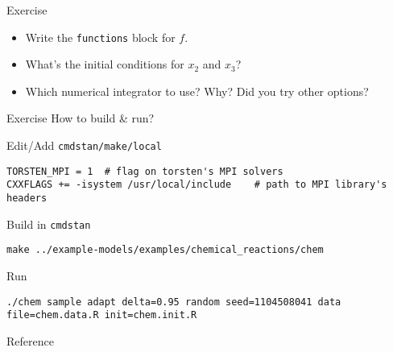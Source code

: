 \documentclass[presentation]{beamer}
\begin{document}
\begin{frame}[fragile,label={sec:org35c8477}]{Exercise}
 \begin{itemize}
\item Write the \texttt{functions} block for \(f\).
\item What's the initial conditions for \(x_2\) and \(x_3\)?
\item Which numerical integrator to use? Why? Did you try other options?
\end{itemize}
\end{frame}

\begin{frame}[fragile,label={sec:orgd3616bc}]{Exercise}
 How to build \& run?
\begin{block}{Edit/Add \texttt{cmdstan/make/local}}
\begin{verbatim}
TORSTEN_MPI = 1  # flag on torsten's MPI solvers
CXXFLAGS += -isystem /usr/local/include    # path to MPI library's headers
\end{verbatim}
\end{block}
\begin{block}{Build in \texttt{cmdstan}}
\begin{verbatim}
make ../example-models/examples/chemical_reactions/chem
\end{verbatim}
\end{block}
\begin{block}{Run}
\begin{verbatim}
./chem sample adapt delta=0.95 random seed=1104508041 data file=chem.data.R init=chem.init.R
\end{verbatim}
\end{block}
\end{frame}

\begin{frame}[label={sec:org22a6b1c}]{Reference}


\end{frame}
\end{document}
